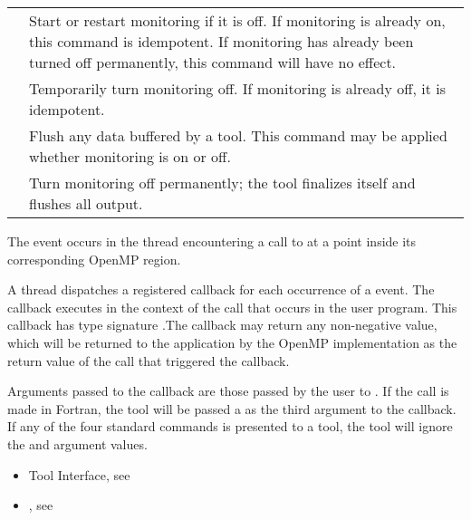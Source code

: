 \nolinenumbers
\renewcommand{\arraystretch}{1.5}
\tablelasttail{\hline}
\begin{supertabular}{p{2in} p{3.0in}}
{} & Start or
restart monitoring if it is off. If monitoring is already on, this
command is idempotent. If monitoring has already been turned off
permanently, this command will have no effect.\\
{} & Temporarily
turn monitoring off. If monitoring is already off, it is idempotent.\\
{} & Flush any data buffered by a tool.
This command may be applied whether monitoring is on or off.\\
{} & Turn monitoring off permanently;
the tool finalizes itself and flushes all output.\\
\end{supertabular}

\linenumbers

\events

The  event occurs in the thread encountering a call
to  at a point inside its corresponding OpenMP region.

\tools

A thread dispatches a registered
 callback for each occurrence of a
 event.  The callback executes in the context of the
call that occurs in the user program.  This callback has type
signature .The callback may return
any non-negative value, which will be returned to the application by
the OpenMP implementation as the return value of the
 call that triggered the callback.


Arguments passed to the callback are those passed by the user to
. If the call is made in Fortran, the tool
will be passed a  as the third argument to the callback. If
any of the four standard commands is presented to a tool, the tool
will ignore the  and  argument values.



\crossreferences
\begin{itemize}
\item Tool Interface, see
\item {}, see
\end{itemize}

